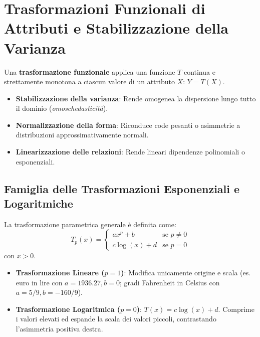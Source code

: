 \section{Trasformazioni Funzionali di Attributi e Stabilizzazione della Varianza}
\label{sec:dm-functional-transformations}

Una \textbf{trasformazione funzionale} applica una funzione $T$ continua e strettamente monotona a ciascun valore di un attributo $X$: $Y = T(X)$.
\begin{itemize}[noitemsep]
    \item \textbf{Stabilizzazione della varianza}: Rende omogenea la dispersione lungo tutto il dominio (\textit{omoschedasticità}).
    \item \textbf{Normalizzazione della forma}: Riconduce code pesanti o asimmetrie a distribuzioni approssimativamente normali.
    \item \textbf{Linearizzazione delle relazioni}: Rende lineari dipendenze polinomiali o esponenziali.
\end{itemize}

\subsection{Famiglia delle Trasformazioni Esponenziali e Logaritmiche}
La trasformazione parametrica generale è definita come:
\begin{equation}
    T_p(x) = \begin{cases}
        a x^p + b & \text{se } p \neq 0 \\
        c \log(x) + d & \text{se } p = 0
    \end{cases}
\end{equation}
con $x > 0$.
\begin{itemize}
    \item \textbf{Trasformazione Lineare ($p = 1$)}: Modifica unicamente origine e scala (es. euro in lire con $a=1936.27, b=0$; gradi Fahrenheit in Celsius con $a=5/9, b=-160/9$).
    \item \textbf{Trasformazione Logaritmica ($p = 0$)}: $T(x) = c\log(x) + d$. Comprime i valori elevati ed espande la scala dei valori piccoli, contrastando l'asimmetria positiva destra.
\end{itemize}

